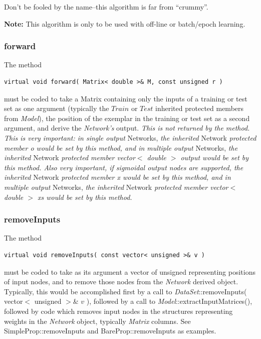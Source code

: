 \documentclass{report}
\begin{document}
Don't be fooled by the name--this algorithm is far from ``crummy''.

{\bf Note:} This algorithm is only to be used with off-line or
batch/epoch learning.

\subsubsection{forward}

The method

\begin{verbatim}
virtual void forward( Matrix< double >& M, const unsigned r )
\end{verbatim}

must be coded to take a Matrix containing only the inputs of a
training or test set as one argument (typically the $Train$ or $Test$
inherited protected members from {\em Model}), the position of the
exemplar in the training or test set as a second argument, and derive
the {\em Network's} output.  {\em This is not returned by the method.
This is very important: in single output} Networks, {\em the
inherited} Network {\em protected member o would be set by this
method, and in multiple output} Networks, {\em the inherited} Network
{\em protected member vector$<$ double $>$ output would be set by this
method.  Also very important, if sigmoidal output nodes are supported,
the inherited} Network {\em protected member x would be set by this
method, and in multiple output} Networks, {\em the inherited} Network
{\em protected member vector$<$ double $>$ xs would be set by this
method.}

\subsubsection{removeInputs}\label{removeInputs}

The method

\begin{verbatim}
virtual void removeInputs( const vector< unsigned >& v )
\end{verbatim}

must be coded to take as its argument a vector of unsigned
representing positions of input nodes, and to remove those nodes from
the {\em Network} derived object.  Typically, this would be
accomplished first by a call to
{\em DataSet}::removeInputs( vector$<$ unsigned $>$\& $v$ ),
followed by a call to {\em Model}::extractInputMatrices(), followed by
code which removes input nodes in the structures representing weights
in the {\em Network} object, typically {\em Matrix} columns.  See
SimpleProp::removeInputs and BareProp::removeInputs as examples.
\end{document}
